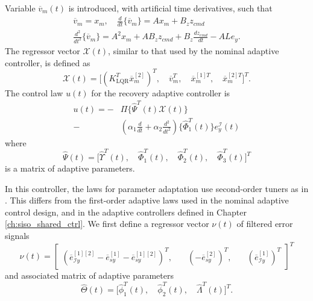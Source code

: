 Variable $\overline{v}_m(t)$ is introduced, with artificial time derivatives, such that
\begin{equation}
\begin{gathered}
	\overline{v}_m = x_m, \quad \frac{d }{dt}\{ \overline{v}_m \} = A x_m + B_z z_{cmd} \\
	\frac{d^2}{dt^2} \{ \overline{v}_m \} = A^2 x_m + A B_z z_{cmd} + B_z \frac{dz_{cmd}}{dt} - A L e_y.
\end{gathered}
\end{equation}
The regressor vector $\mathcal{X}(t)$, similar to that used by the nominal adaptive controller, is defined as
\begin{equation}
\mathcal{X}(t) = \big[ (K_{\textrm{LQR}}^T \overline{x}_m^{[2]})^T,\quad \overline{v}_m^T,\quad \overline{x}_m^{[1]T},\quad \overline{x}_m^{[2]T} \big]^T.
\end{equation}
The control law $u(t)$ for the recovery adaptive controller is
\begin{equation}
\begin{aligned}
	u (t) = -&\Pi \big \{ \hat{\Psi}^T(t) \mathcal{X}(t) \big \} \\ - & (\alpha_1 \frac{d}{dt} + \alpha_2 \frac{d^2}{dt^2}) \big \{ \hat{\Phi}_1^T(t) \big \} e_y^\mathcal{I} (t) 
\end{aligned} \label{eq:u_rd3}
\end{equation}
where 
\begin{equation}
\hat{\Psi}(t) = \big[ \hat{\Upsilon}^T(t),\quad \hat{\Phi}_1^T(t),\quad \hat{\Phi}_2^T(t),\quad \hat{\Phi}_3^T(t) \big]^T 
\end{equation}
is a matrix of adaptive parameters. 

In this controller, the laws for parameter adaptation use second-order tuners as in \cite{qu2016phd}. This differs from the first-order adaptive laws used in the nominal adaptive control design, and in the adaptive controllers defined in Chapter \ref{ch:siso_shared_ctrl}. We first define a regressor vector $\nu(t)$ of filtered error signals
\begin{equation}
	\nu(t) = \begin{bmatrix}
		(\overline{e}_{\mathcal{I}y}^{[1][2]} - \overline{e}_{sy}^{[1]} - \overline{e}_{sy}^{[1][2]})^T, & \quad (-\overline{e}_{sy}^{[2]})^T, & \quad (\overline{e}_{\mathcal{I}y}^{[1]})^T
	\end{bmatrix}^T
\end{equation}
and associated matrix of adaptive parameters
\begin{equation}
\hat{\Theta}(t) = \big[ \hat{\phi}_1^T(t),\quad \hat{\phi}_2^T(t),\quad \hat{\Lambda}^T(t) \big]^T.
\end{equation}

